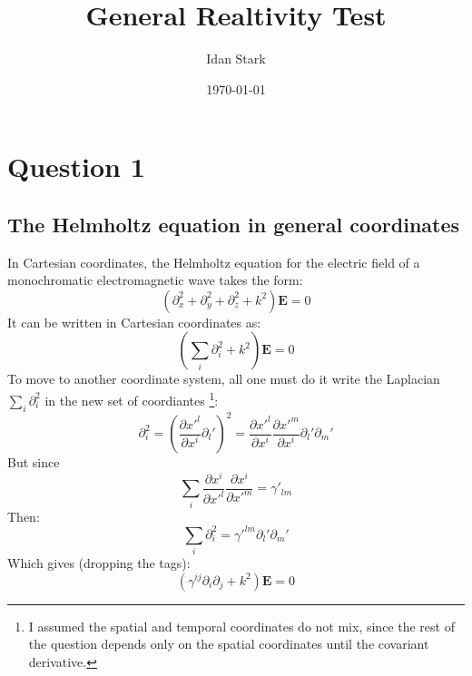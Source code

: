 \documentclass{article}
\title{General Realtivity Test}
\author{Idan Stark}
\date{\today}
\begin{document}
\maketitle

\section{Question 1}
\subsection{The Helmholtz equation in general coordinates}
In Cartesian coordinates, the Helmholtz equation for the electric field of a monochromatic electromagnetic wave takes the form:
\begin{equation}
    \left(\partial_x^2 + \partial_y^2 + \partial_z^2 + k^2\right)\boldsymbol{E} = 0
\end{equation}
It can be written in Cartesian coordinates as:
\begin{equation}
    \left(\sum_i \partial_i^2 + k^2\right)\boldsymbol{E} = 0
\end{equation}
To move to another coordinate system, all one must do it write the Laplacian $\sum_i \partial_i^2$ in the new set of coordiantes \footnote{I assumed the spatial and temporal coordinates do not mix, since the rest of the question depends only on the spatial coordinates until the covariant derivative.}:
\begin{equation}
    \partial_i^2 = \left(\frac{\partial x'^l}{\partial x^i}\partial_l'\right)^2 = \frac{\partial x'^l}{\partial x^i}\frac{\partial x'^m}{\partial x^i}\partial_l'\partial_m'
\end{equation}
But since
\begin{equation}
    \sum_i \frac{\partial x^i}{\partial x'^l}\frac{\partial x^i}{\partial x'^m} = \gamma'_{lm}
\end{equation}
Then:
\begin{equation}
    \sum_i \partial_i^2 = \gamma'^{lm} \partial_l'\partial_m'
\end{equation}
Which gives (dropping the tags):
\begin{equation}
    \left(\gamma^{ij} \partial_i\partial_j + k^2\right)\boldsymbol{E} = 0
\end{equation}
\end{document}
